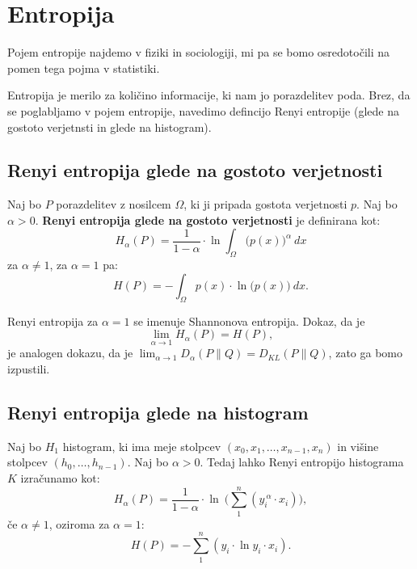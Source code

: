 \section{Entropija}

Pojem entropije najdemo v fiziki in sociologiji, mi pa se bomo osredotočili na pomen tega pojma v statistiki.

Entropija je merilo za količino informacije, ki nam jo porazdelitev poda. Brez, da se poglabljamo v pojem entropije, navedimo defincijo Renyi entropije (glede na gostoto verjetnsti in glede na histogram).

\subsection{Renyi entropija glede na gostoto verjetnosti}

\begin{definicija}
    Naj bo $P$ porazdelitev z nosilcem $\Omega$, ki ji pripada gostota verjetnosti $p$. Naj bo $\alpha > 0$. \textbf{Renyi entropija glede na gostoto verjetnosti} je definirana kot:
    \begin{equation}
        H_{\alpha}(P)=\frac{1}{1-\alpha} \cdot \ln\int_{\Omega}\Big(p(x)\Big)^{\alpha}\  dx
    \end{equation}
    za $\alpha \neq 1$, za $\alpha = 1$ pa:
    \begin{equation}
        H(P)=-\int_{\Omega} p(x) \cdot \ln\Big(p(x)\Big) \  dx.
    \end{equation}
\end{definicija}

\begin{opomba}
    Renyi entropija za $\alpha = 1$ se imenuje Shannonova entropija. Dokaz, da je
    \begin{equation}
        \lim_{\alpha \rightarrow 1} H_\alpha(P) = H(P),
    \end{equation}
    je analogen dokazu, da je $\lim_{\alpha \rightarrow 1} D_\alpha (P \| Q) = D_{KL}(P \| Q)$, zato ga bomo izpustili. 
\end{opomba}

\pagebreak

\subsection{Renyi entropija glede na histogram}

\begin{izrek}
    Naj bo $H_1$ histogram, ki ima meje stolpcev $(x_0,x_1,\ldots,x_{n-1}, x_n)$ in višine stolpcev $(h_0,\ldots,h_{n-1})$. Naj bo $\alpha > 0$. Tedaj lahko Renyi entropijo histograma $K$ izračunamo kot:
    \begin{equation}
        H_\alpha(P) = \frac{1}{1-\alpha} \cdot \ln \  \Big( \sum_{1}^{n}(y_i^{\ \alpha} \cdot x_i) \Big),
        \end{equation}
    če $\alpha \neq 1$, oziroma za $\alpha = 1$:
    \begin{equation}
        H(P) = - \sum_{1}^{n}(y_i \cdot \ln y_i \cdot x_i).
    \end{equation}
\end{izrek}

